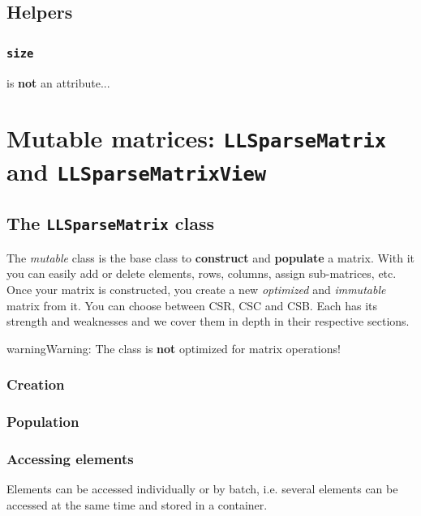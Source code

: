 \documentclass[letterpaper,10pt,english]{sphinxmanual}
\begin{document}
\section{Helpers}
\label{matrix_creation:helpers}

\subsection{\texttt{size}}
\label{matrix_creation:size}
 is \textbf{not} an attribute...


\chapter{Mutable matrices: \texttt{LLSparseMatrix} and \texttt{LLSparseMatrixView}}
\label{mutable_ll_mat::doc}\label{mutable_ll_mat:mutable-matrices-llsparsematrix-and-llsparsematrixview}\label{mutable_ll_mat:ll-mat}

\section{The \texttt{LLSparseMatrix} class}
\label{mutable_ll_mat:the-llsparsematrix-class}
The \emph{mutable}  class is the base class to \textbf{construct} and \textbf{populate} a matrix. With it you can easily add or delete elements, rows, columns, assign sub-matrices, etc. Once your matrix is constructed,
you create a new \emph{optimized} and \emph{immutable} matrix from it. You can choose between CSR, CSC and CSB. Each has its strength and weaknesses and we cover them in depth in their respective sections.

\begin{notice}{warning}{Warning:}
The  class is \textbf{not} optimized for matrix operations!
\end{notice}


\subsection{Creation}
\label{mutable_ll_mat:creation}

\subsection{Population}
\label{mutable_ll_mat:population}

\subsection{Accessing elements}
\label{mutable_ll_mat:accessing-elements}
Elements can be accessed individually or by batch, i.e. several elements can be accessed at the same time and stored in a container.
\end{document}
